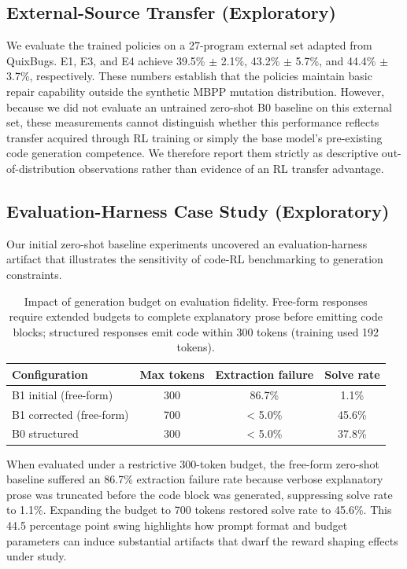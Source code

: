 \documentclass{article}
\begin{document}
\subsection{External-Source Transfer (Exploratory)}
We evaluate the trained policies on a 27-program external set adapted from QuixBugs. E1, E3, and E4 achieve 39.5\% $\pm$ 2.1\%, 43.2\% $\pm$ 5.7\%, and 44.4\% $\pm$ 3.7\%, respectively. These numbers establish that the policies maintain basic repair capability outside the synthetic MBPP mutation distribution. However, because we did not evaluate an untrained zero-shot B0 baseline on this external set, these measurements cannot distinguish whether this performance reflects transfer acquired through RL training or simply the base model's pre-existing code generation competence. We therefore report them strictly as descriptive out-of-distribution observations rather than evidence of an RL transfer advantage.

\subsection{Evaluation-Harness Case Study (Exploratory)}
\label{sec:harness}
Our initial zero-shot baseline experiments uncovered an evaluation-harness artifact that illustrates the sensitivity of code-RL benchmarking to generation constraints.

\begin{table}[h]
\centering
\small
\begin{tabular}{l c c c}
\toprule
\textbf{Configuration} & \textbf{Max tokens} & \textbf{Extraction failure} & \textbf{Solve rate} \\
\midrule
B1 initial (free-form) & 300 & 86.7\% & 1.1\% \\
B1 corrected (free-form) & 700 & < 5.0\% & 45.6\% \\
B0 structured & 300 & < 5.0\% & 37.8\% \\
\bottomrule
\end{tabular}
\caption{Impact of generation budget on evaluation fidelity. Free-form responses require extended budgets to complete explanatory prose before emitting code blocks; structured responses emit code within 300 tokens (training used 192 tokens).}
\label{tab:truncation}
\end{table}

When evaluated under a restrictive 300-token budget, the free-form zero-shot baseline suffered an 86.7\% extraction failure rate because verbose explanatory prose was truncated before the code block was generated, suppressing solve rate to 1.1\%. Expanding the budget to 700 tokens restored solve rate to 45.6\%. This 44.5 percentage point swing highlights how prompt format and budget parameters can induce substantial artifacts that dwarf the reward shaping effects under study.
\end{document}
